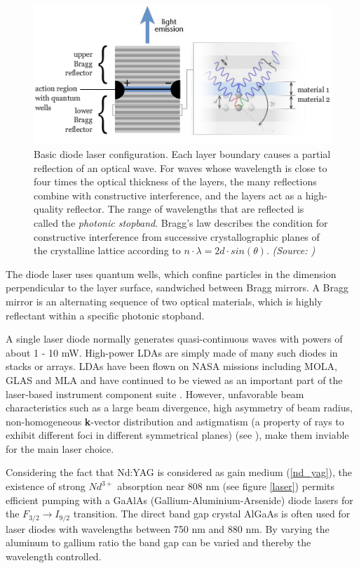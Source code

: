 \begin{figure} [ht]
\centering
\includegraphics[scale=0.6]{chapters/img/diodelaser.png}	
\caption[Basic diode laser configuration]{Basic diode laser configuration. Each layer boundary causes a partial reflection of an optical wave. For waves whose wavelength is close to four times the optical thickness of the layers, the many reflections combine with constructive interference, and the layers act as a high-quality reflector. The range of wavelengths that are reflected is called the \textit{photonic stopband}. Bragg's law describes the condition for constructive interference from successive crystallographic planes of the crystalline lattice according to $n\cdot\lambda  =2d\cdot sin(\theta)$. \emph{(Source: \cite{laser_power})}} 
\label{diode_laser_configuration}
\end{figure}

The diode \ac{laser} uses quantum wells, which confine particles in the dimension perpendicular to the layer surface, sandwiched between Bragg mirrors. A Bragg mirror is an alternating sequence of two optical materials, which is highly reflectant within a specific photonic stopband.

A single \ac{laser} diode normally generates quasi-continuous waves with powers of about 1 - 10 mW. High-power \acp{LDA} are simply made of many such diodes in stacks or arrays. \acp{LDA} have been flown on NASA missions including MOLA, GLAS and MLA and have continued to be viewed as an important part of the \acs{laser}-based instrument component suite \cite{lda_main}. However, unfavorable beam characteristics such as a large beam divergence, high asymmetry of beam radius, non-homogeneous \textbf{k}-vector distribution and astigmatism (a property of rays to exhibit different foci in different symmetrical planes) (see \cite{lasertech}), make them inviable for the main laser choice.

Considering the fact that Nd:YAG is considered as gain medium (\ref{nd_yag}), the existence of strong $Nd^{3+}$ absorption near 808 nm (see figure \ref{laser}) permits efficient pumping with a GaAlAs (Gallium-Aluminium-Arsenide) diode \acp{laser} for the $F_{3/2}\rightarrow I_{9/2}$ transition. The direct band gap crystal AlGaAs is often used for laser diodes with wavelengths between 750 nm and 880 nm. By varying the aluminum to gallium ratio the band gap can be varied and thereby the wavelength controlled.

